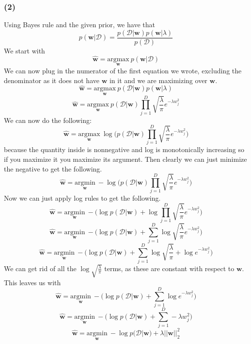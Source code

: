 \documentclass{article}
\newcommand*{\wb}{\ensuremath{\mathbf{w}}}
\begin{document}
\subsubsection*{(2)}
Using Bayes rule and the given prior, we have that
\[ p(\wb|\mathcal{D}) = \frac{p(\mathcal{D}|\wb)
    p(\wb|\lambda)}{p(\mathcal{D})} \]
We start with
\[ \hat{\wb} = \underset{\wb}{\text{argmax}} \> p(\wb|\mathcal{D}) \]
We can now plug in the numerator of the first equation we wrote, excluding the
denominator as it does not have $\wb$ in it and we are maximizing over $\wb$.
\[ \hat{\wb} = \underset{\wb}{\text{argmax}} \> p(\mathcal{D}|\wb)
    p(\wb|\lambda) \]
\[ \hat{\wb} = \underset{\wb}{\text{argmax}} \>
    p(\mathcal{D}|\wb) \prod_{j=1}^{D}
    \sqrt{\frac{\lambda}{\pi}} e^{-\lambda w_j^2} \]
We can now do the following:
\[ \hat{\wb} = \underset{\wb}{\text{argmax}} \>
    \log \Big(p(\mathcal{D}|\wb)
    \prod_{j=1}^{D} \sqrt{\frac{\lambda}{\pi}} e^{-\lambda w_j^2} \Big) \]
because the quantity inside is nonnegative and log is monotonically
increasing so if you maximize it you maximize its argument. Then clearly we can just
minimize the negative to get the following.
\[ \hat{\wb} = \underset{\wb}{\text{argmin}} \>
    -\log \Big(p(\mathcal{D}|\wb)
    \prod_{j=1}^{D} \sqrt{\frac{\lambda}{\pi}} e^{-\lambda w_j^2} \Big) \]
Now we can just apply log rules to get the following.
\[ \hat{\wb} = \underset{\wb}{\text{argmin}} \>
    - \Big( \log p(\mathcal{D}|\wb)
    + \log \prod_{j=1}^{D} \sqrt{\frac{\lambda}{\pi}} e^{-\lambda w_j^2} \Big) \]
\[ \hat{\wb} = \underset{\wb}{\text{argmin}} \>
    - \Big( \log p(\mathcal{D}|\wb)
    + \sum_{j=1}^D \log \sqrt{\frac{\lambda}{\pi}} e^{-\lambda w_j^2} \Big) \]
\[ \hat{\wb} = \underset{\wb}{\text{argmin}} \>
    - \Big( \log p(\mathcal{D}|\wb)
    + \sum_{j=1}^D \log \sqrt{\frac{\lambda}{\pi}} + \log e^{-\lambda w_j^2} \Big) \]
We can get rid of all the $\log \sqrt{\frac{\lambda}{\pi}}$ terms, as these are
constant with respect to $\wb$. This leaves us with
\[ \hat{\wb} = \underset{\wb}{\text{argmin}} \>
    - \Big( \log p(\mathcal{D}|\wb)
    + \sum_{j=1}^D \log e^{-\lambda w_j^2} \Big) \]
\[ \hat{\wb} = \underset{\wb}{\text{argmin}} \>
    - \Big( \log p(\mathcal{D}|\wb)
    + \sum_{j=1}^D -\lambda w_j^2 \Big) \]
\[ \hat{\wb} = \underset{\wb}{\text{argmin}} \>
    - \log p(\mathcal{D}|\wb) + \lambda ||\wb||_2^2 \]
\end{document}

